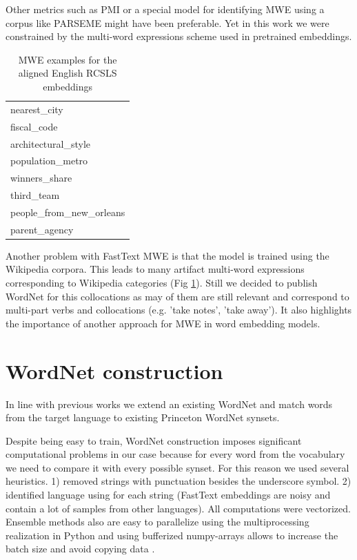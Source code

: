 \documentclass[11pt,a4paper]{article}
\begin{document}
Other metrics such as PMI \cite{bouma2009normalized} or a special model for identifying MWE using a corpus like PARSEME \cite{savary2018parseme} might have been preferable. Yet in this work we were constrained by the multi-word expressions scheme used in pretrained embeddings.
\begin{table}[!htbp]
	\small
	\caption{MWE examples for the aligned English RCSLS embeddings}
	\label{mwe-wiki}		
	\centering
	\begin{tabular}{|l|}
		\hline
 nearest\_city \\
 fiscal\_code \\
 architectural\_style \\
 population\_metro \\
 winners\_share \\
 third\_team \\
 people\_from\_new\_orleans \\
 parent\_agency \\
 \hline
	\end{tabular}
\end{table}

Another problem with FastText MWE is that the model is trained using the Wikipedia corpora. This leads to many artifact multi-word expressions corresponding to Wikipedia categories (Fig \ref{mwe-wiki}). Still we decided to publish WordNet for this collocations as may of them are still relevant and correspond to multi-part verbs and collocations (e.g. 'take notes', 'take away'). It also highlights the importance of another approach for MWE in word embedding models.
\section{WordNet construction}
In line with previous works \cite{Vossen1998,tufis2006romanian} we extend an existing WordNet and match words from the target language to existing Princeton WordNet synsets.

Despite being easy to train, WordNet construction imposes significant computational problems in our case because for every word from the vocabulary we need to compare it with every possible synset. For this reason we used several heuristics. 1) removed strings with punctuation besides the underscore symbol. 2) identified language using \cite{Joulin2016} for each string (FastText embeddings are noisy and contain a lot of samples from other languages).  All computations were vectorized. Ensemble methods also are easy to parallelize using the multiprocessing realization in Python and using bufferized numpy-arrays allows to increase the batch size and avoid copying data \cite{gorelick2014high}.
\end{document}
